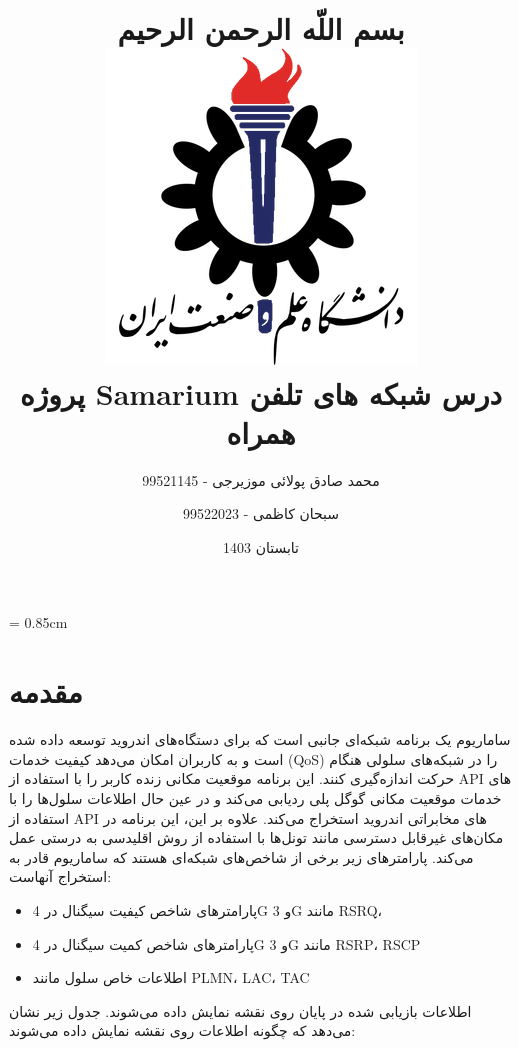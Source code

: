 \documentclass[oneside]{report}
\title{
      بسم اللّه الرحمن الرحیم
      \\[2cm]
    \includegraphics[width=0.5\linewidth]{../images/iust.png}
    \\
    پروژه Samarium درس شبکه های تلفن همراه
    }
\author{محمد صادق پولائی موزیرجی - 99521145 \\ 
    \and سبحان کاظمی - 99522023}
\date{تابستان 1403}
\begin{document}
\maketitle
\tableofcontents
\listoffigures
\baselineskip = 0.85cm
\newpage

\section{مقدمه}
ساماریوم یک برنامه شبکه‌ای جانبی است که برای دستگاه‌های اندروید توسعه داده شده است و به کاربران امکان می‌دهد کیفیت خدمات (QoS) را در شبکه‌های سلولی هنگام حرکت اندازه‌گیری کنند. این برنامه موقعیت مکانی زنده کاربر را با استفاده از API های خدمات موقعیت مکانی گوگل پلی ردیابی می‌کند و در عین حال اطلاعات سلول‌ها را با استفاده از API های مخابراتی اندروید استخراج می‌کند. علاوه بر این، این برنامه در مکان‌های غیرقابل دسترسی مانند تونل‌ها با استفاده از روش اقلیدسی به درستی عمل می‌کند. پارامترهای زیر برخی از شاخص‌های شبکه‌ای هستند که ساماریوم قادر به استخراج آنهاست:
\begin{itemize}
      \item پارامترهای شاخص کیفیت سیگنال در 4G و 3G مانند RSRQ، 
      \item پارامترهای شاخص کمیت سیگنال در 4G و 3G مانند RSRP، RSCP
      \item اطلاعات خاص سلول مانند PLMN، LAC، TAC
\end{itemize}
اطلاعات بازیابی شده در پایان روی نقشه نمایش داده می‌شوند. جدول زیر نشان می‌دهد که چگونه اطلاعات روی نقشه نمایش داده می‌شوند:
\end{document}
